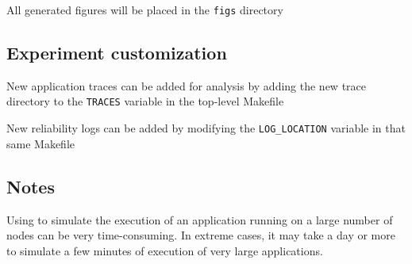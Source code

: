 All generated figures will be placed in the {\texttt{figs}} directory

\subsection{Experiment customization}

New application traces can be added for analysis by adding the new trace
directory to the {\texttt{TRACES}} variable in the top-level Makefile

New reliability logs can be added by modifying the {\texttt{LOG\_LOCATION}}
variable in that same Makefile

\subsection{Notes}

Using \LogGOPSim to simulate the execution of an application running on 
a large number of nodes can be very time-consuming.  In extreme cases,
it may take a day or more to simulate a few minutes of execution of
very large applications.
